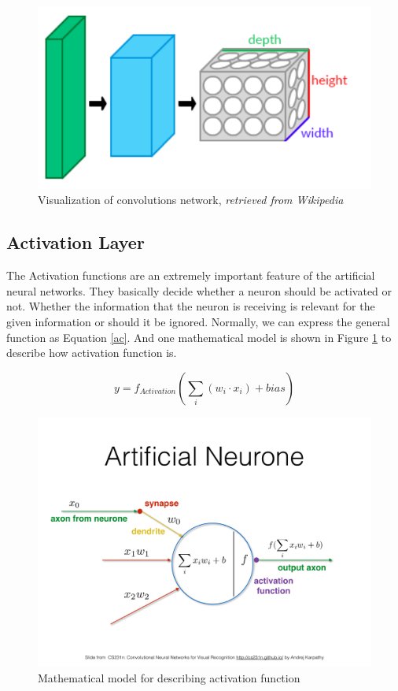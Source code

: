     \begin{figure}[!h]
        \centering
        \includegraphics[scale = 0.3]{Figures/Conv_layers.png}
        \caption{Visualization of convolutions network, \textit{retrieved from Wikipedia}}
    \end{figure}

    \subsection{Activation Layer}
    The Activation functions are an extremely important feature of the artificial neural networks. They basically decide whether a neuron should be activated or not. Whether the information that the neuron is receiving is relevant for the given information or should it be ignored. Normally, we can express the general function as Equation \ref{ac}. And one mathematical model is shown in Figure \ref{action} to describe how activation function is.

    \begin{equation}
        y = f_{Activation}(\sum_{i}(w_i \cdot x_i) + bias)
        \label{ac}
    \end{equation}

    \begin{figure}
        \centering
        \includegraphics[scale=0.3]{Figures/action.pdf}
        \caption{Mathematical model for describing activation function}
        \label{action}
    \end{figure}

